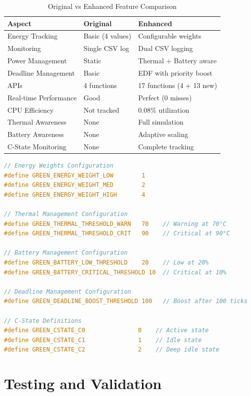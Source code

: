 \documentclass[11pt,a4paper]{article}
\begin{document}
\begin{table}[h]
\centering
\begin{tabular}{|l|l|l|}
\hline
\textbf{Aspect} & \textbf{Original} & \textbf{Enhanced} \\
\hline
Energy Tracking & Basic (4 values) & Configurable weights \\
Monitoring & Single CSV log & Dual CSV logging \\
Power Management & Static & Thermal + Battery aware \\
Deadline Management & Basic & EDF with priority boost \\
APIs & 4 functions & 17 functions (4 + 13 new) \\
Real-time Performance & Good & Perfect (0 misses) \\
CPU Efficiency & Not tracked & 0.08\% utilization \\
Thermal Awareness & None & Full simulation \\
Battery Awareness & None & Adaptive scaling \\
C-State Monitoring & None & Complete tracking \\
\hline
\end{tabular}
\caption{Original vs Enhanced Feature Comparison}
\end{table}

\begin{lstlisting}[language=C, caption=Enhanced Configuration Options]
// Energy Weights Configuration
#define GREEN_ENERGY_WEIGHT_LOW        1
#define GREEN_ENERGY_WEIGHT_MED        2  
#define GREEN_ENERGY_WEIGHT_HIGH       4

// Thermal Management Configuration
#define GREEN_THERMAL_THRESHOLD_WARN   70    // Warning at 70°C
#define GREEN_THERMAL_THRESHOLD_CRIT   90    // Critical at 90°C

// Battery Management Configuration  
#define GREEN_BATTERY_LOW_THRESHOLD    20    // Low at 20%
#define GREEN_BATTERY_CRITICAL_THRESHOLD 10  // Critical at 10%

// Deadline Management Configuration
#define GREEN_DEADLINE_BOOST_THRESHOLD 100   // Boost after 100 ticks

// C-State Definitions
#define GREEN_CSTATE_C0               0    // Active state
#define GREEN_CSTATE_C1               1    // Idle state
#define GREEN_CSTATE_C2               2    // Deep idle state
\end{lstlisting}

\section{Testing and Validation}
\end{document}
